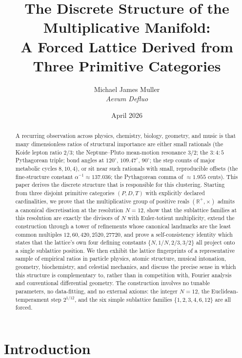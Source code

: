 \documentclass[11pt,a4paper]{article}
\title{\bfseries The Discrete Structure of the Multiplicative Manifold:\\[2pt]
A Forced Lattice Derived from Three Primitive Categories}
\author{Michael James Muller\\
\small\textit{Aevum Defluo}}
\date{April 2026}
\theoremstyle{definition}
\theoremstyle{remark}
\newcommand{\R}{\mathbb{R}}
\begin{document}
\maketitle

\begin{abstract}
\noindent
A recurring observation across physics, chemistry, biology, geometry, and music is that many dimensionless ratios of structural importance are either small rationals (the Koide lepton ratio $2/3$; the Neptune--Pluto mean-motion resonance $3/2$; the $3{:}4{:}5$ Pythagorean triple; bond angles at $120^{\circ}$, $109.47^{\circ}$, $90^{\circ}$; the step counts of major metabolic cycles $8,10,4$), or sit near such rationals with small, reproducible offsets (the fine-structure constant $\alpha^{-1}\approx 137.036$; the Pythagorean comma of $\approx 1.955$ cents). This paper derives the discrete structure that is responsible for this clustering. Starting from three disjoint primitive categories $(P,D,T)$ with explicitly declared cardinalities, we prove that the multiplicative group of positive reals $(\R^{+},\times)$ admits a canonical discretisation at the resolution $N=12$, show that the sublattice families at this resolution are exactly the divisors of $N$ with Euler-totient multiplicity, extend the construction through a tower of refinements whose canonical landmarks are the least common multiples $12,60,420,2520,27720$, and prove a self-consistency identity which states that the lattice's own four defining constants $\{N,1/N,2/3,3/2\}$ all project onto a single sublattice position. We then exhibit the lattice fingerprints of a representative sample of empirical ratios in particle physics, atomic structure, musical intonation, geometry, biochemistry, and celestial mechanics, and discuss the precise sense in which this structure is complementary to, rather than in competition with, Fourier analysis and conventional differential geometry. The construction involves no tunable parameters, no data-fitting, and no external axioms: the integer $N=12$, the Euclidean-temperament step $2^{1/12}$, and the six simple sublattice families $\{1,2,3,4,6,12\}$ are all forced.
\end{abstract}

\tableofcontents

\section{Introduction}
\end{document}
